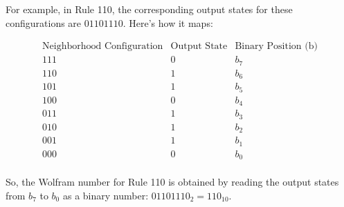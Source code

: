 For example, in Rule 110, the corresponding output states for these configurations are \( 01101110 \). Here's how it maps:

\[
\begin{array}{ccc}
\text{Neighborhood Configuration} & \text{Output State} & \text{Binary Position (b)} \\
\hline
111 & 0 & b_7 \\
110 & 1 & b_6 \\
101 & 1 & b_5 \\
100 & 0 & b_4 \\
011 & 1 & b_3 \\
010 & 1 & b_2 \\
001 & 1 & b_1 \\
000 & 0 & b_0 \\
\end{array}
\]

So, the Wolfram number for Rule 110 is obtained by reading the output states from \( b_7 \) to \( b_0 \) as a binary number: \( 01101110_2 = 110_{10} \).

